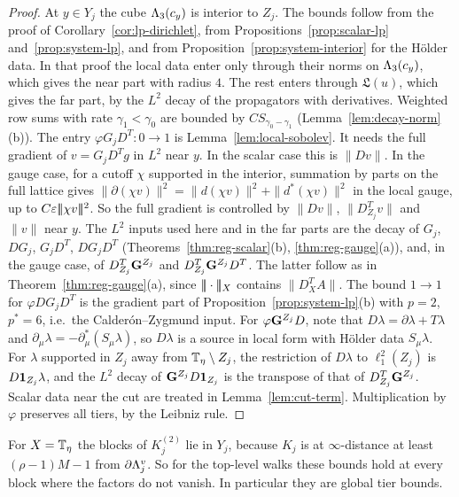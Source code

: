 \begin{proof}
At $y\in Y_j$ the cube $\Lambda_3(c_y)$ is interior to $Z_j$. The bounds follow from the proof of Corollary~\ref{cor:lp-dirichlet}, from Propositions~\ref{prop:scalar-lp} and~\ref{prop:system-lp}, and from Proposition~\ref{prop:system-interior} for the H\"older data. In that proof the local data enter only through their norms on $\Lambda_3(c_y)$, which gives the near part with radius $4$. The rest enters through $\mathfrak L(u)$, which gives the far part, by the $L^2$ decay of the propagators with derivatives. Weighted row sums with rate $\gamma_1<\gamma_0$ are bounded by $CS_{\gamma_0-\gamma_1}$ (Lemma~\ref{lem:decay-norm}(b)). The entry $\varphi G_jD^T\colon0\to1$ is Lemma~\ref{lem:local-sobolev}. It needs the full gradient of $v=G_jD^Tg$ in $L^2$ near $y$. In the scalar case this is $\|Dv\|$. In the gauge case, for a cutoff $\chi$ supported in the interior, summation by parts on the full lattice gives $\|\partial(\chi v)\|^2=\|d(\chi v)\|^2+\|d^*(\chi v)\|^2$ in the local gauge, up to $C\varepsilon|\!|\!|\chi v|\!|\!|^2$. So the full gradient is controlled by $\|Dv\|$, $\|D^T_{Z_j}v\|$ and $\|v\|$ near $y$. The $L^2$ inputs used here and in the far parts are the decay of $G_j$, $DG_j$, $G_jD^T$, $DG_jD^T$ (Theorems~\ref{thm:reg-scalar}(b), \ref{thm:reg-gauge}(a)), and, in the gauge case, of $D^T_{Z_j}\mathbf G^{Z_j}$ and $D^T_{Z_j}\mathbf G^{Z_j}D^T$. The latter follow as in Theorem~\ref{thm:reg-gauge}(a), since $|\!|\!|\cdot|\!|\!|_X$ contains $\|D^T_XA\|$. The bound $1\to1$ for $\varphi DG_jD^T$ is the gradient part of Proposition~\ref{prop:system-lp}(b) with $p=2$, $p^*=6$, i.e.\ the Calder\'on--Zygmund input. For $\varphi\mathbf G^{Z_j}D$, note that $D\lambda=\partial\lambda+T\lambda$ and $\partial_\mu\lambda=-\partial^*_\mu(S_\mu\lambda)$, so $D\lambda$ is a source in local form with H\"older data $S_\mu\lambda$. For $\lambda$ supported in $Z_j$ away from $\mathbb T_\eta\setminus Z_j$, the restriction of $D\lambda$ to $\ell^2_1(Z_j)$ is $D\mathbf 1_{Z_j}\lambda$, and the $L^2$ decay of $\mathbf G^{Z_j}D\mathbf 1_{Z_j}$ is the transpose of that of $D^T_{Z_j}\mathbf G^{Z_j}$. Scalar data near the cut are treated in Lemma~\ref{lem:cut-term}. Multiplication by $\varphi$ preserves all tiers, by the Leibniz rule.
\end{proof}

For $X=\mathbb T_\eta$ the blocks of $K_j^{(2)}$ lie in $Y_j$, because $K_j$ is at $\infty$-distance at least $(\rho-1)M-1$ from $\partial\Lambda^v_j$. So for the top-level walks these bounds hold at every block where the factors do not vanish. In particular they are global tier bounds.

